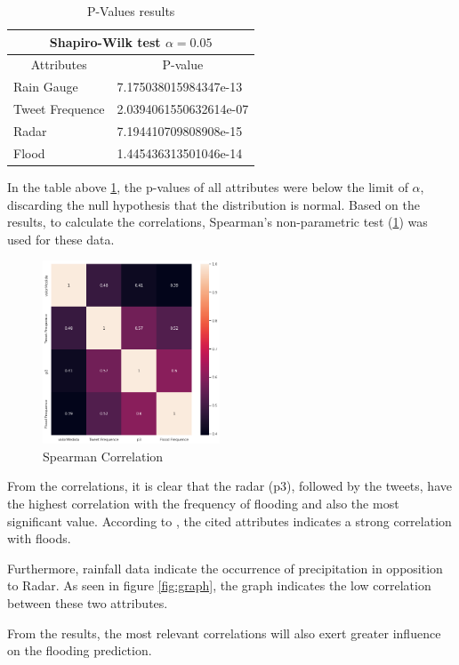 \begin{table}[H]\label{shapiro}
	\caption{P-Values results}
	\begin{center}
	\begin{tabular}{ll}
		\hline
		\multicolumn{2}{c}{Shapiro-Wilk test $\alpha=0.05$}                              \\ \hline
		\multicolumn{1}{c|}{Attributes}      & \multicolumn{1}{c}{P-value} \\ \hline
		\multicolumn{1}{l|}{Rain Gauge}      & 7.175038015984347e-13       \\ \hline
		\multicolumn{1}{l|}{Tweet Frequence} & 2.0394061550632614e-07      \\ \hline
		\multicolumn{1}{l|}{Radar}           & 7.194410709808908e-15       \\ \hline
		\multicolumn{1}{l|}{Flood}           & 1.445436313501046e-14       \\ \hline
	\end{tabular}
\end{center}
\end{table}

In the table above \ref{shapiro}, the p-values of all attributes were below the limit of $\alpha$, discarding the null hypothesis that the distribution is normal. Based on the results, to calculate the correlations, Spearman's non-parametric test (\ref{fig:corr}) was used for these data. 

\begin{figure}[H]
	\centering
	\includegraphics[width=0.47\textwidth]{figs/corr.png}
	\caption{Spearman Correlation}
	\label{fig:corr}
\end{figure}

From the correlations, it is clear that the radar (p3), followed by the tweets, have the highest correlation with the frequency of flooding and also the most significant value. According to , the cited attributes indicates a strong correlation with floods. 

Furthermore, rainfall data indicate the occurrence of precipitation in opposition to Radar. As seen in figure \ref{fig:graph}, the graph indicates the low correlation between these two attributes.

From the results, the most relevant correlations will also exert greater influence on the flooding prediction.
